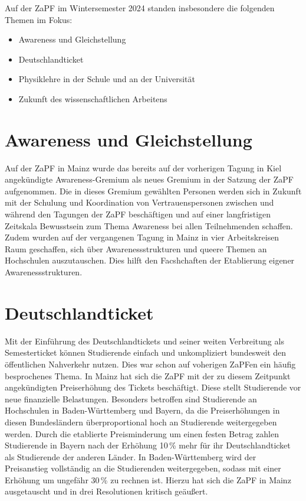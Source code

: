 \documentclass{scrartcl}
\begin{document}
	Auf der ZaPF im Wintersemester 2024 standen insbesondere die folgenden Themen im Fokus:
	\begin{itemize}
		\item Awareness und Gleichstellung
		\item Deutschlandticket
		\item Physiklehre in der Schule und an der Universität
		\item Zukunft des wissenschaftlichen Arbeitens
		
	\end{itemize}
	
	\section*{Awareness und Gleichstellung}
	Auf der ZaPF in Mainz wurde das bereits auf der vorherigen Tagung in Kiel angekündigte Awareness-Gremium als neues Gremium in der Satzung der ZaPF aufgenommen. Die in dieses Gremium gewählten Personen werden sich in Zukunft mit der Schulung und Koordination von Vertrauenspersonen zwischen und während den Tagungen der ZaPF beschäftigen und auf einer langfristigen Zeitskala Bewusstsein zum Thema Awareness bei allen Teilnehmenden schaffen. Zudem wurden auf der vergangenen Tagung in Mainz in vier Arbeitskreisen Raum geschaffen, sich über Awarenessstrukturen und queere Themen an Hochschulen auszutauschen. Dies hilft den Facshchaften der Etablierung eigener Awarenessstrukturen. 
	
	\section*{Deutschlandticket}
	Mit der Einführung des Deutschlandtickets und seiner weiten Verbreitung als Semesterticket können Studierende einfach und unkompliziert bundesweit den öffentlichen Nahverkehr nutzen. Dies war schon auf voherigen ZaPFen ein häufig besprochenes Thema. In Mainz hat sich die ZaPF mit der zu diesem Zeitpunkt angekündigten Preiserhöhung des Tickets beschäftigt. Diese stellt Studierende vor neue finanzielle Belastungen. Besonders betroffen sind Studierende an Hochschulen in Baden-Württemberg und Bayern, da die Preiserhöhungen in diesen Bundesländern überproportional hoch an Studierende weitergegeben werden. Durch die etablierte Preisminderung um einen festen Betrag zahlen Studierende in Bayern nach der Erhöhung 10\,\% mehr für ihr Deutschlandticket als Studierende der anderen Länder. In Baden-Württemberg wird der Preisanstieg vollständig an die Studierenden weitergegeben, sodass mit einer Erhöhung um ungefähr 30\,\% zu rechnen ist. Hierzu hat sich die ZaPF in Mainz ausgetauscht und in drei Resolutionen kritisch geäußert.
	
\end{document}
